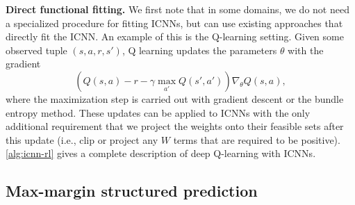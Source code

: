 \textbf{Direct functional fitting.}
We first note that in some domains, we do not need a specialized procedure for
fitting ICNNs, but can use existing approaches that directly fit the ICNN.
An example of this is the Q-learning setting.
Given some observed tuple $(s,a,r,s')$, Q learning updates the
parameters $\theta$ with the gradient
\begin{equation}
\label{eq:q-learning-update}
\left(Q(s,a) - r - \gamma\max_{a'} Q (s',a') \right )\nabla_\theta Q(s,a),
\end{equation}
where the maximization step is carried out with gradient descent or
the bundle entropy method.
These updates can be applied to ICNNs with the only additional requirement that
we project the weights onto their feasible sets after this update
(i.e., clip or project any $W$ terms that are required to be positive).
\cref{alg:icnn-rl}
gives a complete description of
deep Q-learning with ICNNs.


\subsection{Max-margin structured prediction}
\label{sec:icnn:max-margin}

